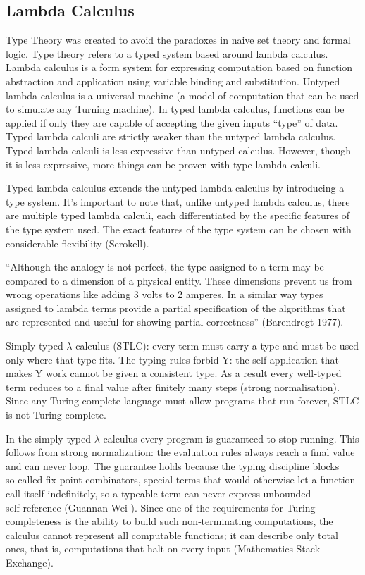 \documentclass{article}
\newcommand{\1}{\mathbbm{1}}
\theoremstyle{plain}
\theoremstyle{definition}
\numberwithin{equation}{section}
\begin{document}
\subsection{Lambda Calculus}

Type Theory was created to avoid the paradoxes in naive set theory and formal logic. Type theory refers to a typed system based around lambda calculus. Lambda calculus is a form system for expressing computation based on function abstraction and application using variable binding and substitution. Untyped lambda calculus is a universal machine (a model of computation that can be used to simulate any Turning machine). In typed lambda calculus, functions can be applied if only they are capable of accepting the given inputs “type” of data. Typed lambda calculi are strictly weaker than the untyped lambda calculus.  Typed lambda calculi is less expressive than untyped calculus. However, though it is less expressive, more things can be proven with type lambda calculi. 

Typed lambda calculus extends the untyped lambda calculus by introducing a type system. It’s important to note that, unlike untyped lambda calculus, there are multiple typed lambda calculi, each differentiated by the specific features of the type system used. The exact features of the type system can be chosen with considerable flexibility (Serokell).  

“Although the analogy is not perfect, the type assigned to a term may be compared to a dimension of a physical entity. These dimensions prevent us from wrong operations like adding 3 volts to 2 amperes. In a similar way types assigned to lambda terms provide a partial specification of the algorithms that are represented and useful for showing partial correctness” (Barendregt 1977). 

Simply typed $\lambda$‑calculus (STLC): every term must carry a type and must be used only where that type fits. The typing rules forbid Y: the self‑application that makes Y work cannot be given a consistent type. As a result every well‑typed term reduces to a final value after finitely many steps (strong normalisation). Since any Turing‑complete language must allow programs that run forever, STLC is not Turing complete.

In the simply typed $\lambda$‑calculus every program is guaranteed to stop running. This follows from strong normalization: the evaluation rules always reach a final value and can never loop. The guarantee holds because the typing discipline blocks so‑called fix‑point combinators, special terms that would otherwise let a function call itself indefinitely, so a typeable term can never express unbounded self‑reference (Guannan Wei ). Since one of the requirements for Turing completeness is the ability to build such non‑terminating computations, the calculus cannot represent all computable functions; it can describe only total ones, that is, computations that halt on every input (Mathematics Stack Exchange).
\end{document}

